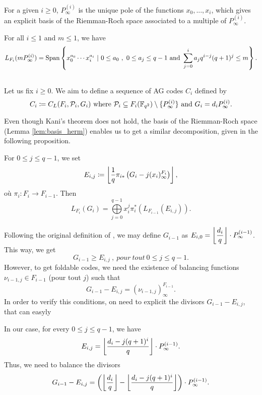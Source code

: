 \documentclass[10pt]{article}
\begin{document}
For a given $i \geq 0$, $P^{(i)}_{\infty}$ is the unique pole of the functions $x_0,...,x_i$, which gives an explicit basis of the Riemman-Roch space associated to a multiple of $P^{(i)}_{\infty}$.

\begin{lemma}\label{lem:basis_herm}
For all $i \leq 1$ and $m \leq 1$, we have 
\[L_{F_i}(mP^{(i)}_{\infty}) = \operatorname{Span}\left\{x_0^{a_0} \cdots x_i^{a_i} \ | \ 0 \leq a_0 \ , \ 0 \leq a_j \leq q-1 \text{ and } \sum\limits_{j=0}^i a_jq^{i-j}(q+1)^j \leq m \right\}.\]
\end{lemma}

\subsection{}

Let us fix $i \geq 0$. We aim to define a sequence of AG codes $C_i$ defined by 
\[C_i \coloneqq C_L(F_i,\mathcal{P}_{i},G_i) \text{ where } \mathcal{P}_{i} \subseteq F_i(\mathbb{F}_{q^2}) \setminus \{P_\infty^{(i)}\} \text{ and } G_i = d_iP^{(i)}_{\infty}.\]

Even though Kani's theorem does not hold, the basis of the Riemman-Roch space (Lemma \ref{lem:basis_herm}) enables us to get a similar decomposition, given in the following proposition.

\begin{proposition} 
	For $0 \leq j \leq q-1$, we set
	\[E_{i,j} \coloneqq \left\lfloor \frac{1}{q} \pi_{i*}\left(G_i-j(x_i)^{F_i}_{\infty}\right)\right\rfloor,\]
	où $\pi_i : F_i \rightarrow F_{i-1}$. Then 
\[L_{F_i}(G_i) = \bigoplus\limits_{j=0}^{q-1} x_i^j \pi_i^*\left(L_{F_{i-1}}(E_{i,j})\right).\]
\end{proposition}

Following the original definition of \cite{BN20}, we may define $G_{i-1}$ as $E_{i,0} = \left\lfloor \dfrac{d_i}{q} \right\rfloor \cdot P^{(i-1)}_{\infty}$. This way, we get 
\[G_{i-1} \geq E_{i,j} \ , \ pour \ tout \ 0 \leq j \leq q-1.\] 
However, to get foldable codes, we need the existence of balancing functions  $\nu_{i-1,j} \in F_{i-1}$ (pour tout $j$) such that 
\begin{equation}\label{eq:balancing_fct_herm}
	G_{i-1}-E_{i,j} = (\nu_{i-1,j})^{F_{i-1}}_{\infty}.
\end{equation}
In order to verify this conditions, on need to explicit the divisors $G_{i-1}-E_{i,j}$, that can easyly 

\begin{lemma} \label{divisor à équi}
In our case, for every $0 \leq j \leq q-1$, we have
\[E_{i,j} = \left\lfloor \dfrac{d_i-j(q+1)^i}{q}\right\rfloor \cdot P^{(i-1)}_{\infty}.\]
Thus, we need to balance the divisors
\[G_{i-1}-E_{i,j} = \left(\left\lfloor \dfrac{d_i}{q} \right\rfloor - \left\lfloor \dfrac{d_i-j(q+1)^i}{q}\right\rfloor\right) \cdot P^{(i-1)}_{\infty}.\]

\end{lemma}
\end{document}
